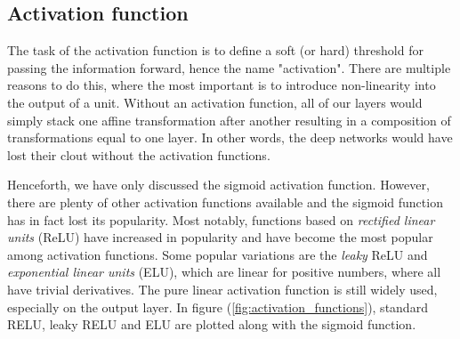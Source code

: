 \subsection{Activation function}
The task of the activation function is to define a soft (or hard) threshold for passing the information forward, hence the name "activation". There are multiple reasons to do this, where the most important is to introduce non-linearity into the output of a unit. Without an activation function, all of our layers would simply stack one affine transformation after another resulting in a composition of transformations equal to one layer. In other words, the deep networks would have lost their clout without the activation functions. 

Henceforth, we have only discussed the sigmoid activation function. However, there are plenty of other activation functions available and the sigmoid function has in fact lost its popularity. Most notably, functions based on \textit{rectified linear units} (ReLU) have increased in popularity and have become the most popular among activation functions. Some popular variations are the \textit{leaky} ReLU and \textit{exponential linear units} (ELU), which are linear for positive numbers, where all have trivial derivatives. The pure linear activation function is still widely used, especially on the output layer. In figure (\ref{fig:activation_functions}), standard RELU, leaky RELU and ELU are plotted along with the sigmoid function.

